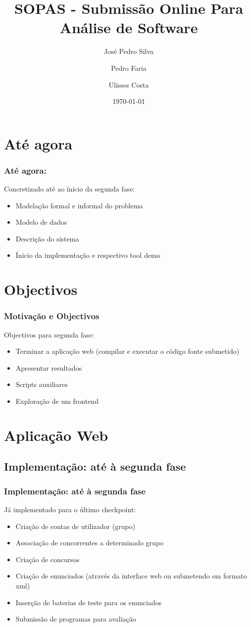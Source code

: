 \documentclass{beamer}
\title{SOPAS - Submissão Online Para Análise de Software}
\author{José Pedro Silva \and
Pedro Faria \and
Ulisses Costa
}
\date{\today}
\institute{Engenharia de Linguagens\\
Projecto integrado
}
\begin{document}
\begin{frame}
   \titlepage
\end{frame}

\section{Até agora}
\begin{frame} \frametitle{Até agora:}
Concretizado até ao ínicio da segunda fase:
\begin{itemize}
\item Modelação formal e informal do problema
\item Modelo de dados
\item Descrição do sistema
\item Ínicio da implementação e respectivo tool demo
\end{itemize}
\end{frame}


\section{Objectivos}

\begin{frame} \frametitle{Motivação e Objectivos}
Objectivos para segunda fase:
\begin{itemize}
\item Terminar a aplicação web (compilar e executar o código fonte submetido)
\item Apresentar resultados
\item Scripts auxiliares
\item Exploração de um frontend
\end{itemize}
\end{frame}

\section{Aplicação Web}

\subsection{Implementação: até à segunda fase}
\begin{frame} \frametitle{Implementação: até à segunda fase}
Já implementado para o último checkpoint:
\begin{itemize}
\item Criação de contas de utilizador (grupo)
\item Associação de concorrentes a determinado grupo
\item Criação de concursos
\item Criação de enunciados (através da interface web ou submetendo em formato xml)
\item Inserção de baterias de teste para os enunciados
\item Submissão de programas para avaliação
\end{itemize}
\end{frame}
\end{document}
